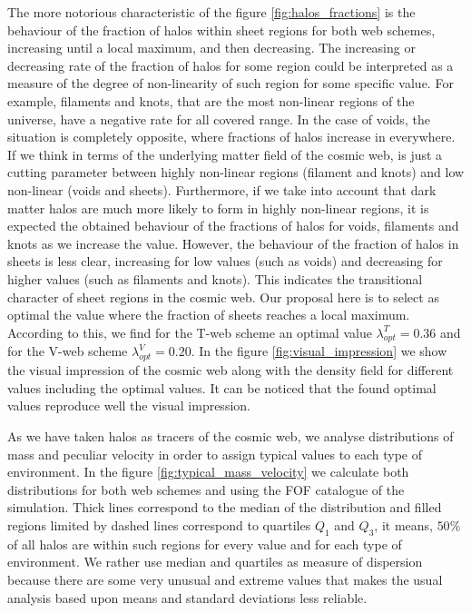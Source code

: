 \documentclass[a4,useAMS,usenatbib,usegraphicx]{latex/mn2e}
\begin{document}
The more notorious characteristic of the figure \ref{fig:halos_fractions} 
is the behaviour of the fraction of halos within sheet regions for both 
web schemes, increasing until a local maximum, and then decreasing. The 
increasing or decreasing rate of the fraction of halos for some region 
could be interpreted as a measure of the degree of non-linearity of such 
region for some specific \lth value. For example, filaments and knots, 
that are the most non-linear regions of the universe, have a negative rate
for all covered \lth range. In the case of voids, the situation is 
completely opposite, where fractions of halos increase in everywhere. If 
we think in terms of the underlying matter field of the cosmic web, \lth 
is just a cutting parameter between highly non-linear regions (filament 
and knots) and low non-linear (voids and sheets). Furthermore, if we take 
into account that dark matter halos are much more likely to form in highly 
non-linear regions, it is expected the obtained behaviour of the fractions 
of halos for voids, filaments and knots as we increase the \lth value. 
However, the behaviour of the fraction of halos in sheets is less clear,
increasing for low \lth values (such as voids) and decreasing for higher 
\lth values (such as filaments and knots). This indicates the transitional 
character of sheet regions in the cosmic web. Our proposal here is to 
select as optimal \lth the value where the fraction of sheets reaches a
local maximum. According to this, we find for the T-web scheme an optimal 
value $\lambda_{opt}^T = 0.36$ and for the V-web scheme $\lambda_{opt}^V = 
0.20$. In the figure \ref{fig:visual_impression} we show the visual 
impression of the cosmic web along with the density field for different 
\lth values including the optimal values. It can be noticed that the found 
optimal values reproduce well the visual impression.



As we have taken halos as tracers of the cosmic web, we analyse 
distributions of mass and peculiar velocity in order to assign typical 
values to each type of environment. In the figure 
\ref{fig:typical_mass_velocity} we calculate both distributions for both 
web schemes and using the FOF catalogue of the simulation. Thick lines 
correspond to the median of the distribution and filled regions limited by
dashed lines correspond to quartiles $Q_1$ and $Q_3$, it means, $50\%$ of
all halos are within such regions for every \lth value and for each type 
of environment. We rather use median and quartiles as measure of 
dispersion because there are some very unusual and extreme values that 
makes the usual analysis based upon means and standard deviations less 
reliable.
\end{document}
